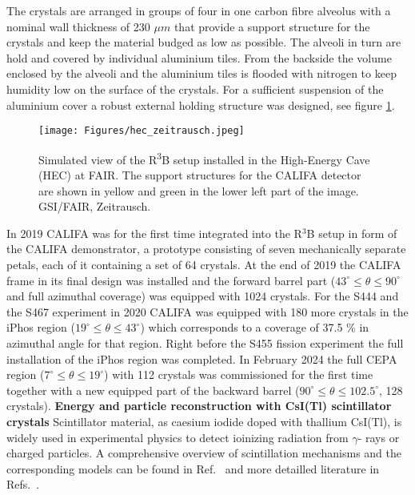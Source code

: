 The crystals are arranged in groups of four in one carbon fibre alveolus with a nominal wall thickness of 230 $\mu m$\cite{tdr:barrel} that provide a support structure for the crystals and keep the material budged as low as possible. The alveoli in turn are hold and covered by individual aluminium tiles. From the backside the volume enclosed by the alveoli and the aluminium tiles is flooded with nitrogen to keep humidity low on the surface of the crystals. For a sufficient suspension of the aluminium cover a robust external holding structure was designed, see figure \ref{fig:califa_holding_structure}.\newline
\begin{figure}
    \centering
    \texttt{[image: Figures/hec\_zeitrausch.jpeg]}
    \caption{ 
	Simulated view of the R\textsuperscript{3}B setup installed in the High-Energy Cave (HEC) at FAIR. The support structures for the CALIFA detector are shown in yellow and green in the lower left part of the image. \textcopyright{} GSI/FAIR, Zeitrausch.
    }
    \label{fig:califa_holding_structure}

\end{figure}
In 2019 CALIFA was for the first time integrated into the R$^3$B setup in form of the CALIFA demonstrator, a prototype consisting of seven mechanically separate petals, each of it containing a set of 64 crystals.\newline
At the end of 2019 the CALIFA frame in its final design was installed and the forward barrel part ($43^{\circ} \leq \theta \leq 90^{\circ}$ and full azimuthal coverage) was equipped with 1024 crystals.\newline
For the S444 and the S467 experiment in 2020 CALIFA was equipped with 180 more crystals in the iPhos region ($19^{\circ} \leq \theta \leq 43^{\circ}$) which corresponds to a coverage of 37.5 \% in azimuthal angle for that region. Right before the S455 fission experiment \cite{grana2023fission} the full installation of the iPhos region was completed.\newline
In February 2024 the full CEPA region ($7^{\circ} \leq \theta \leq 19^{\circ}$) with 112 crystals was commissioned for the first time together with a new equipped part of the backward barrel ($90^{\circ} \leq \theta \leq 102.5^{\circ}$, 128 crystals).\newline   
\textbf{Energy and particle reconstruction with CsI(Tl) scintillator crystals}\newline
Scintillator material, as caesium iodide doped with thallium CsI(Tl), is widely used in experimental physics to detect ioinizing radiation from $\gamma$- rays or charged particles. A comprehensive overview of scintillation mechanisms and the corresponding models can be found in Ref.~\cite{bendel2014entwicklung} and more detailled literature in Refs.~\cite{murray1961scintillation,zazubovich2001physics}.\newline
